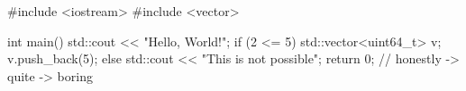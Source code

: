 \documentclass[main.tex]{subfiles}
\begin{document}

\obrazek
{} %

\obrazek
\begin{cppcode}
     #include <iostream>
     #include <vector>

     int main() {
          std::cout << "Hello, World!";
          if (2 <= 5) {
               std::vector<uint64_t> v;
               v.push_back(5);
          } else {
               std::cout << "This is not possible";
          }
          return 0;
     }
     // honestly -> quite -> boring
\end{cppcode}
\end{document}

